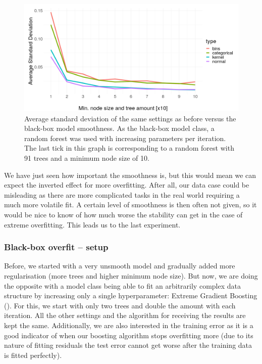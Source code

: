 \documentclass[]{krantz}
\begin{document}
\begin{figure}

{\centering \includegraphics[width=0.99\linewidth]{images/sd_smoothness_presi2} 

}

\caption{Average standard deviation of the same settings as before versus the black-box model smoothness. As the black-box model class, a random forest was used with increasing parameters per iteration. The last tick in this graph is corresponding to a random forest with 91 trees and a minimum node size of 10.}\label{fig:figsmooth}
\end{figure}

We have just seen how important the smoothness is, but this would mean
we can expect the inverted effect for more overfitting. After all, our
data case could be misleading as there are more complicated tasks in the
real world requiring a much more volatile fit. A certain level of
smoothness is then often not given, so it would be nice to know of how
much worse the stability can get in the case of extreme overfitting.
This leads us to the last experiment.

\subsubsection{Black-box overfit --
setup}\label{black-box-overfit-setup}

Before, we started with a very unsmooth model and gradually added more
regularisation (more trees and higher minimum node size). But now, we
are doing the opposite with a model class being able to fit an
arbitrarily complex data structure by increasing only a single
hyperparameter: Extreme Gradient Boosting (\citet{XGBoost}). For this,
we start with only two trees and double the amount with each iteration.
All the other settings and the algorithm for receiving the results are
kept the same. Additionally, we are also interested in the training
error as it is a good indicator of when our boosting algorithm stops
overfitting more (due to its nature of fitting residuals the test error
cannot get worse after the training data is fitted perfectly).
\end{document}
